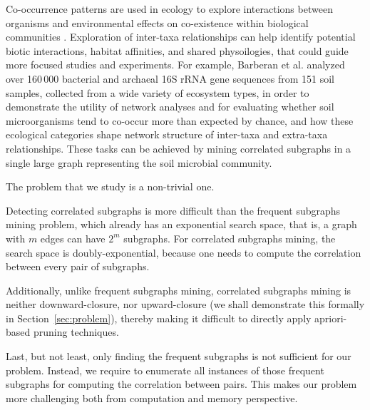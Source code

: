 {
Co-occurrence patterns are used in ecology to explore interactions between organisms
and environmental effects on co-existence within biological communities \cite{WHH14}.
Exploration of inter-taxa relationships can help identify potential biotic interactions, habitat affinities, and shared physoilogies,
that could guide more focused studies and experiments. For example, Barberan et al. \cite{BBCF12} analyzed
over 160\,000 bacterial and archaeal 16S rRNA gene sequences from 151 soil samples, collected
from a wide variety of ecosystem types, in order to demonstrate the utility of network
analyses and for evaluating whether soil microorganisms tend to co-occur more
than expected by chance, and how these
ecological categories shape network structure of inter-taxa and extra-taxa relationships.
These tasks can be achieved by mining correlated subgraphs in a single large graph
representing the soil microbial community.

The problem that we study is a non-trivial one.
%
\squishlist
\item Detecting correlated subgraphs is more difficult
than the frequent subgraphs mining problem, which already has an exponential search space, that is, a graph with $m$ edges
can have $2^m$ subgraphs. For correlated subgraphs mining, the search space is doubly-exponential, because
one needs to compute the correlation between every pair of subgraphs.
\item Additionally, unlike frequent subgraphs mining,
correlated subgraphs mining is neither downward-closure, nor upward-closure (we shall demonstrate this formally
in Section~\ref{sec:problem}), thereby making it difficult to directly apply apriori-based pruning techniques.
\item Last, but not least, only finding the frequent subgraphs is not sufficient for our problem.
Instead, we require to enumerate all instances of those frequent subgraphs for computing the correlation
between pairs. This makes our problem more challenging both from computation and memory perspective.
\squishend

}
